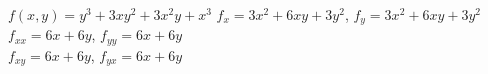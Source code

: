 {$f(x,y) = y^3+3xy^2+3x^2y+x^3$
}
{$f_x=3x^2+6xy+3y^2$, $f_y=3x^2+6xy+3y^2$\\
$f_{xx}=6x+6y$, $f_{yy}=6x+6y$\\
$f_{xy}=6x+6y$, $f_{yx}=6x+6y$\\
}